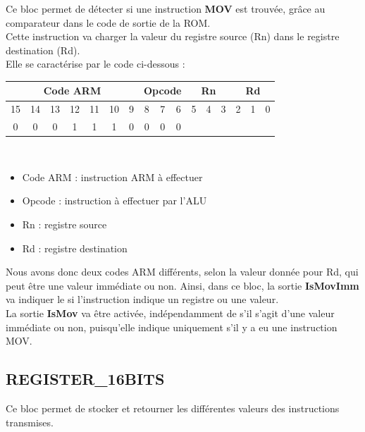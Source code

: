 \documentclass[a4paper]{article} %
\begin{document}
\medskip

Ce bloc permet de détecter si une instruction \textbf{MOV} est trouvée, grâce au comparateur dans le code de sortie de la ROM.
\\Cette instruction va charger la valeur du registre source (Rn) dans le registre destination (Rd).\\
Elle se caractérise par le code ci-dessous : 
\\
\begin{tabular}{|ccccccc|ccc|ccc|ccc|}
    \hline
    \multicolumn{7}{|c|}{Code ARM}  & \multicolumn{3}{|c|}{Opcode} & \multicolumn{3}{|c|}{Rn} & \multicolumn{3}{|c|}{Rd}\\
    \hline
    15 & 14 & 13 & 12 & 11 & 10 & 9 & 8 & 7 & 6                    & 5 & 4 & 3                & 2 & 1 & 0 \\
    \hline
    0  & 0  & 0  & 1  & 1  & 1  & 0 & 0 & 0 & 0                    & \multicolumn{3}{|c|}{}   &\multicolumn{3}{|c|}{}\\
    \hline     
    \end{tabular}
\\

\begin{itemize}
    \item     Code ARM : instruction ARM à effectuer
    \item     Opcode : instruction à effectuer par l'ALU
    \item     Rn : registre source
    \item     Rd : registre destination
\end{itemize}

\medskip
Nous avons donc deux codes ARM différents, selon la valeur donnée pour Rd, qui peut être une valeur immédiate ou non. Ainsi, dans ce bloc, la sortie \textbf{IsMovImm} va indiquer le si l'instruction indique un registre ou une valeur. 
\\La sortie \textbf{IsMov} va être activée, indépendamment de s'il s'agit d'une valeur immédiate ou non, puisqu'elle indique uniquement s'il y a eu une instruction MOV.



    
\subsection{REGISTER\_16BITS} \label{regi16}
Ce bloc permet de stocker et retourner les différentes valeurs des instructions transmises.
\end{document}
